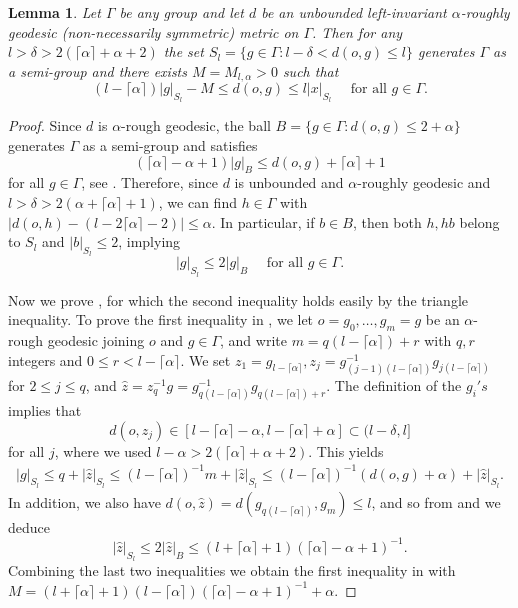 \documentclass[twoside]{amsart}
\newtheorem{lemma}[theorem]{Lemma}
\theoremstyle{definition}
\numberwithin{equation}{section}
\numberwithin{theorem}{section}
\newcommand{\al}{\alpha}
\newcommand{\G}{\Gamma}
\newcommand{\del}{\delta}
\begin{document}
\begin{lemma}\label{lem.worddensesphere}
    Let $\G$ be any group and let $d$ be an unbounded left-invariant $\al$-roughly geodesic (non-necessarily symmetric) metric on $\G$. Then for any $l>\del>2(\lceil\al \rceil+\al+2)$ the set $S_l=\{g\in \G: l-\del<d(o,g)\leq l\}$ generates $\G$ as a semi-group and there exists $M=M_{l,\al}>0$ such that
\begin{equation}\label{eq.WMdensesphere}
        (l-\lceil{\al \rceil})|g|_{S_l}-M\leq d(o,g)\leq l|x|_{S_l} \quad \text{ for all }g\in \G.
    \end{equation}
\end{lemma}
\begin{proof}
  Since $d$ is $\al$-rough geodesic, the ball $B=\{g\in \G \colon d(o,g)\leq  2+\al\}$ generates $\G$ as a semi-group and satisfies \begin{equation}\label{eq.WMdenseball}
      (\lceil{\al \rceil}-\al+1)|g|_B\leq d(o,g)+\lceil{\al \rceil}+1
  \end{equation} for all $g\in \G$, see \cite[Lemma~2.5~(2)]{cantrell-reyes.approx}. Therefore, since $d$ is unbounded and $\al$-roughly geodesic and $l>\del>2(\al+\lceil \al \rceil+1)$, we can find $h\in \G$ with $|d(o,h)-(l-2\lceil{\al \rceil}-2)|\leq \al$. In particular, if $b\in B$, then both $h,hb$ belong to $S_l$ and $|b|_{S_l}\leq 2$, implying
  \begin{equation}\label{eq.ineqS-B}
      |g|_{S_l}\leq 2|g|_B \quad \text{ for all }g\in \G.
  \end{equation}

  Now we prove , for which the second inequality holds easily by the triangle inequality. To prove the first inequality in , we let $o=g_0,\dots,g_m=g$ be an $\al$-rough geodesic joining $o$ and $g\in \G$, and write $m=q(l-\lceil{\al \rceil})+r$ with $q,r$ integers and $0\leq r<l-\lceil{\al \rceil}$. We set $z_1=g_{l-\lceil{\al \rceil}}, z_j=g_{(j-1)(l-\lceil{\al \rceil})}^{-1}g_{j(l-\lceil{\al \rceil})}$ for $2\leq j\leq q$, and $\hat z=z_q^{-1}g=g_{q(l-\lceil{\al \rceil})}^{-1}g_{q(l-\lceil{\al \rceil})+r}$. The definition of the $g_i's$ implies that $$d(o,z_j )\in [l-\lceil{\al \rceil}-\al,l-\lceil{\al \rceil}+\al]\subset (l-\del,l]$$ for all $j$, where we used $l-\al>2(\lceil \al\rceil+\al+2)$. This yields 
  \begin{align*}
      |g|_{S_l} \leq q+|\hat z|_{S_l}\leq (l-\lceil{\al \rceil})^{-1}m+|\hat z|_{S_l}
       \leq (l-\lceil{\al \rceil})^{-1}(d(o,g)+\al)+|\hat z|_{S_l}.
  \end{align*}  
  In addition, we also have $d(o,\hat z)=d(g_{q(l-\lceil{\al \rceil})},g_m)\leq l$, and so from  and   we deduce
  \[|\hat z|_{S_l}\leq 2|\hat z|_B\leq (l+\lceil{\al \rceil}+1)(\lceil{\al \rceil}-\al+1)^{-1}.\]
  Combining the last two inequalities we obtain the first inequality in  with $M=(l+\lceil{\al \rceil}+1)(l-\lceil{\al \rceil})(\lceil{\al \rceil}-\al+1)^{-1}+\al$.
\end{proof}
\end{document}
